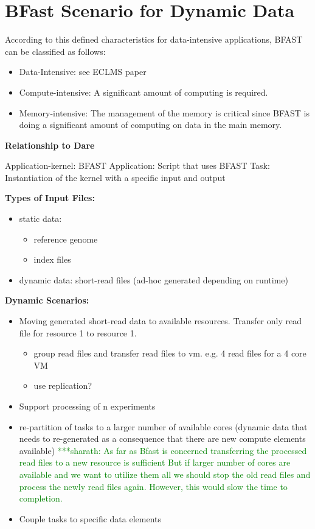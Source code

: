 \documentclass[]{article}
\newcommand{\smnote}[1]{ {\textcolor{green} { ***sharath: #1 }}}
\newcommand{\smnote}[1]{}
\begin{document}
\section{BFast Scenario for Dynamic Data}

According to this defined characteristics for data-intensive applications, BFAST can be classified as follows:
\begin{itemize}
    \item Data-Intensive: see ECLMS paper
    \item Compute-intensive: A significant amount of computing is required.
    \item Memory-intensive: The management of the memory is critical since BFAST 
    is doing a significant amount of computing on data in the main memory.
\end{itemize}


\textbf{Relationship to Dare}

Application-kernel: BFAST 
Application: Script that uses BFAST
Task: Instantiation of the kernel with a specific input and output





\textbf{Types of Input Files:}
\begin{itemize}
	\item static data: 
	\begin{itemize}
		\item reference genome
		\item index files
	\end{itemize}
	\item dynamic data: short-read files (ad-hoc generated depending on runtime)
\end{itemize}

\noindent
\textbf{Dynamic Scenarios:}
\begin{itemize}
	\item Moving generated short-read data to available resources. Transfer only 
	read file for resource 1 to resource 1.
	\begin{itemize}
	   \item group read files and transfer read files to vm. e.g. 4 read files for a 4 core VM
	   \item use replication?
	\end{itemize}
	
	\item Support processing of n experiments 

	\item re-partition of tasks to a larger number of available cores (dynamic 
	data that needs to re-generated as a consequence that there are new compute 
	elements available)
	\smnote{ As far as Bfast is concerned transferring the processed read files to a new resource is sufficient
	But if larger number of cores are available and we want to utilize them all we should stop the old read files and process the newly read files again. However, this would slow the time to completion.}
	
	

    \item Couple tasks to specific data elements
\end{itemize}
\end{document}
